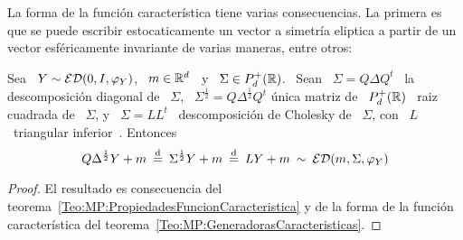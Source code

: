 La forma de la funci\'on caracter\'istica tiene varias consecuencias. La primera
es  que se  puede escribir  estocaticamente un  vector a  simetr\'ia  eliptica a
partir de un vector esf\'ericamente invariante de varias maneras, entre otros:
%
\begin{corolario}
  Sea  \ $Y  \sim  \mathcal{ED}(0,I,\varphi_Y)$, \  $m \in  \mathbb{R}^d$  \ y  \ $\Sigma  \in
  P_d^+(\mathbb{R})$. \ Sean \ $\Sigma = Q \Delta Q^t$ \ la descomposici\'on diagonal
  de \ $\Sigma$, \ $\Sigma^{\frac12} = Q \Delta^{\frac12} Q^t$ \'unica matriz de
  \  $P_d^+(\mathbb{R})$ \  raiz cuadrada  de \  $\Sigma$,  y \  $\Sigma =  L L^t$  \
  descomposici\'on  de  Cholesky   de  \  $\Sigma$,  con  \   $L$  \  triangular
  inferior~\cite{HorJoh13, Bha07}.  Entonces
  \[
  Q \Delta^{\frac12} Y + m \: \stackrel{\mathrm{d}}{=} \:  \Sigma^{\frac12} Y + m \: \stackrel{\mathrm{d}}{=} \: L Y
  + m \: \sim \: \mathcal{ED}(m,\Sigma,\varphi_Y)
  \]
\end{corolario}
%
\begin{proof}
  El             resultado            es             consecuencia            del
  teorema~\ref{Teo:MP:PropiedadesFuncionCaracteristica}  y  de  la forma  de  la
  funci\'on caracter\'istica del teorema~\ref{Teo:MP:GeneradorasCaracteristicas}.
\end{proof}

